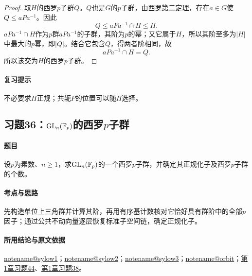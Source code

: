 \documentclass[UTF8,a4paper,11pt,fontset=windows]{ctexart}
\makeatletter
\DeclareMathOperator{\GL}{GL}\DeclareMathOperator{\SL}{SL}
\newcommand{\noteref}[1]{\hyperref[note:#1]{\csname notename@#1\endcsname}}
\newcommand{\proofref}[2]{\hyperref[note:#1]{#2}}
\newcommand{\exref}[2]{\hyperref[ex:#1:#2]{第#1章习题#2}}
\makeatother
\begin{document}

\begin{proof}
取$H$的西罗$p$子群$Q$。$Q$也是$G$的$p$子群，由\proofref{sylow2}{西罗第二定理}，存在$a\in G$使$Q\leq aPa^{-1}$。因此
\[
Q\leq aPa^{-1}\cap H\leq H.
\]
$aPa^{-1}\cap H$作为$p$群$aPa^{-1}$的子群，其阶为$p$的幂；又它属于$H$，所以其阶至多为$|H|$中最大的$p$幂，即$|Q|$。结合它包含$Q$，得两者阶相同，故
\[
aPa^{-1}\cap H=Q.
\]
所以该交为$H$的西罗$p$子群。
\end{proof}

\paragraph{复习提示}
不必要求$H$正规；共轭$P$的位置可以随$H$选择。


\subsection{习题36：\texorpdfstring{$\GL_n(\F_p)$的西罗$p$子群}{GLn(Fp)的西罗p子群}}
\label{ex:2:36}

\paragraph{题目}
设$p$为素数、$n\ge1$，求$\GL_n(\F_p)$的一个西罗$p$子群，并确定其正规化子及西罗$p$子群的个数。

\paragraph{考点与思路}
先构造单位上三角群并计算其阶，再用有序基计数核对它恰好具有群阶中的全部$p$因子；通过公共不动向量逐层恢复标准子空间链，确定正规化子。

\paragraph{所用结论与原文依据}
\noteref{sylow1}；\noteref{sylow2}；\noteref{sylow3}；\noteref{orbit}；\exref{1}{44}、\exref{1}{38}。

\end{document}
